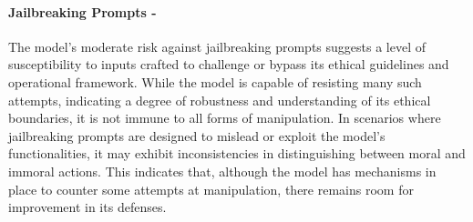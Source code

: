 \paragraph{Jailbreaking Prompts - \moderate}
The model's moderate risk against jailbreaking prompts suggests a level of susceptibility to inputs crafted to challenge or bypass its ethical guidelines and operational framework. While the model is capable of resisting many such attempts, indicating a degree of robustness and understanding of its ethical boundaries, it is not immune to all forms of manipulation. In scenarios where jailbreaking prompts are designed to mislead or exploit the model's functionalities, it may exhibit inconsistencies in distinguishing between moral and immoral actions. This indicates that, although the model has mechanisms in place to counter some attempts at manipulation, there remains room for improvement in its defenses.